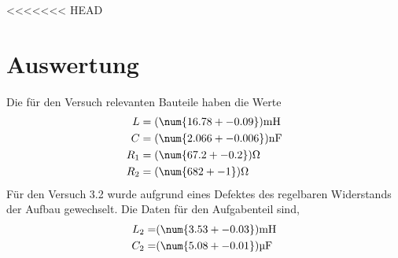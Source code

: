 <<<<<<< HEAD
\section{Auswertung}
\label{sec:Auswertung}
Die für den Versuch relevanten Bauteile haben die Werte
\begin{align}
  L & = (\num{16.78 +- 0.09}) \text{mH}	\\
  C & = (\num{2.066 +- 0.006}) \text{nF} \\
  R_1 & = (\num{67.2 +- 0.2}) \Omega \\
  R_2 & = (\num{682 +- 1}) \Omega
  \label{eqn:Bau}
\end{align}
Für den Versuch 3.2 wurde aufgrund eines Defektes des regelbaren Widerstands der Aufbau gewechselt. Die Daten für den Aufgabenteil sind,
\begin{eqnarray}
  L_2 =& (\num{3.53 +- 0.03}) \text{mH}	\\
  C_2 =& (\num{5.08 +- 0.01}) \text{µF}
\end{eqnarray}
